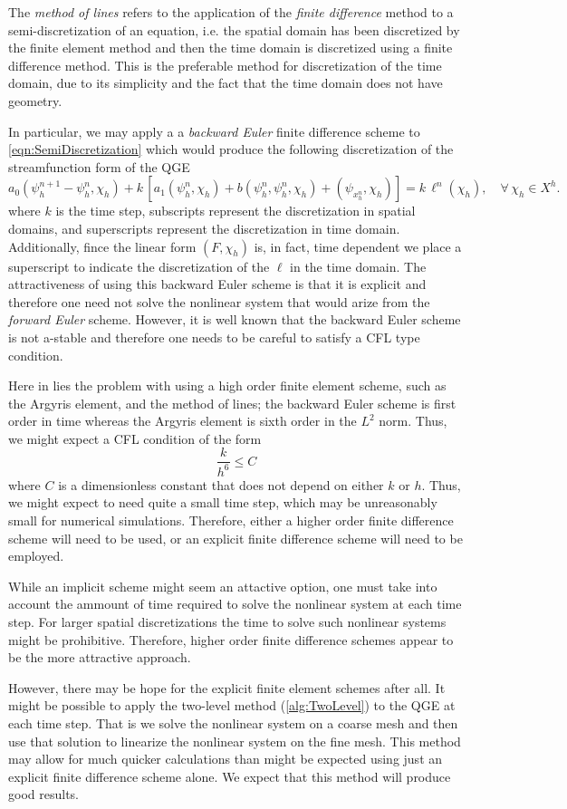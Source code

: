 The \emph{method of lines} refers to the application of the \emph{finite
difference} method to a semi-discretization of an equation, i.e. the spatial
domain has been discretized by the finite element method and then the time
domain is discretized using a finite difference method. This is the preferable
method for discretization of the time domain, due to its simplicity and the fact
that the time domain does not have geometry.

In particular, we may apply a a \emph{backward Euler} finite difference scheme
to \eqref{eqn:SemiDiscretization} which would produce the following
discretization of the streamfunction form of the QGE
\begin{equation}
  a_0(\psi_h^{n+1} - \psi_h^n, \chi_h) + k\, \left[a_1(\psi_h^n,\chi_h) + b(\psi_h^n,\psi_h^n,\chi_h)
      + (\psi_x_h^n,\chi_h)\right] = k\, \ell^n(\chi_h),\quad \forall \, \chi_h \in X^h.
  \label{eqn:BEQGE}
\end{equation}
where $k$ is the time step, subscripts represent the discretization in spatial
domains, and superscripts represent the discretization in time domain.
Additionally, fince the linear form $(F,\chi_h)$ is, in fact, time dependent
we place a superscript to indicate the discretization of the $\ell$ in the time
domain.  The attractiveness of using this backward Euler scheme is that it is
explicit and therefore one need not solve the nonlinear system that would arize
from the \emph{forward Euler} scheme. However, it is well known that the
backward Euler scheme is not a-stable and therefore one needs to be careful to
satisfy a CFL type condition.

Here in lies the problem with using a high order finite element scheme, such as
the Argyris element, and the method of lines; the backward Euler scheme is first
order in time whereas the Argyris element is sixth order in the $L^2$ norm.
Thus, we might expect a CFL condition of the form
\begin{equation*}
  \frac{k}{h^6} \le C
\end{equation*}
where $C$ is a dimensionless constant that does not depend on either $k$ or $h$.
Thus, we might expect to need quite a small time step, which may be unreasonably
small for numerical simulations.  Therefore, either a higher order finite
difference scheme will need to be used, or an explicit finite difference scheme
will need to be employed.

While an implicit scheme might seem an attactive option, one must take into
account the ammount of time required to solve the nonlinear system at each time
step. For larger spatial discretizations the time to solve such nonlinear
systems might be prohibitive. Therefore, higher order finite difference schemes
appear to be the more attractive approach.

However, there may be hope for the explicit finite element schemes after all. It
might be possible to apply the two-level method (\autoref{alg:TwoLevel}) to the
QGE at each time step. That is we solve the nonlinear system on a coarse mesh
and then use that solution to linearize the nonlinear system on the fine mesh.
This method may allow for much quicker calculations than might be expected using
just an explicit finite difference scheme alone. We expect that this method will
produce good results.
